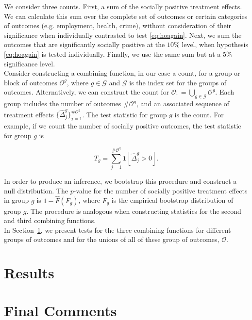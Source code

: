 \noindent We consider three counts. First, a sum of the socially positive treatment effects. We can calculate this sum over the complete set of outcomes or certain categories of outcomes (e.g. employment, health, crime), without consideration of their significance when individually contrasted to test \eqref{eq:hoagain}. Next, we sum the outcomes that are significantly socially positive at the $10\%$ level, when hypothesis \eqref{eq:hoagain} is tested individually. Finally, we use the same sum but at a $5\%$ significance level.\\

\noindent Consider constructing a combining function, in our case a count, for a group or block of outcomes $\mathcal{O}^g$, where $g \in \mathcal{G}$ and $\mathcal{G}$ is the index set for the groups of outcomes. Alternatively, we can construct the count for $\mathcal{O} : =  \bigcup \limits _{g \in \mathcal{G}} \mathcal{O}^g$. Each group includes the number of outcomes $\# \mathcal{O}^g$, and an associated sequence of treatment effects $\{ \widehat{\Delta}_{j}^{g} \}_{j = 1}^{\# \mathcal{O}^g}$. The test statistic for group $g$ is the count. For example, if we count the number of socially positive outcomes, the test statistic for group $g$ is 

\begin{equation}
T_{g} = \sum _{j=1}^{\# \mathcal{O}^g} \mathbf{1} \left[ \widehat{\Delta}_{j}^{g} > 0\right]. 
\end{equation} 

\noindent In order to produce an inference, we bootstrap this procedure and construct a null distribution. The $p$-value for the number of socially positive treatment effects in group $g$ is $1 - \widehat{F} \left( F_{g} \right)$, where $ F_{g}$ is the empirical bootstrap distribution of group $g$. The procedure is analogous when constructing statistics for the second and third combining functions.\\

\noindent In Section~\ref{section:results}, we present tests for the three combining functions for different groups of outcomes and for the unions of all of these group of outcomes, $\mathcal{O}$.

\section{Results} \label{section:results}

\section{Final Comments} \label{section:conclusion}

\clearpage
\singlespace



 
